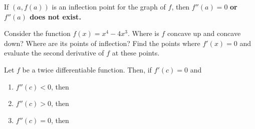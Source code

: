 \documentclass[12pt, a4paper]{article}
\begin{document}
\begin{thrm}
  If \((a,f(a))\) is an inflection point for the graph of \(f\),
  then \(f''(a) = 0\) \textbf{or \(f''(a)\) does not exist.}
\end{thrm}
\vspace{-1in}
\begin{ex}
  Consider the function \(f(x) = x^4-4x^3\). Where is \(f\) concave up
  and concave down? Where are its points of inflection? Find the
  points where \(f'(x) = 0\) and evaluate the second derivative of
  \(f\) at these points.
\end{ex}
\begin{thrm}
  Let \(f\) be a twice differentiable function. Then, if \(f'(c) = 0\)
  and
  \begin{enumerate}
  \item \(f''(c) < 0\), then
  \item \(f''(c) > 0\), then
  \item \(f''(c) = 0\), then
  \end{enumerate}
\end{thrm}
\end{document}
